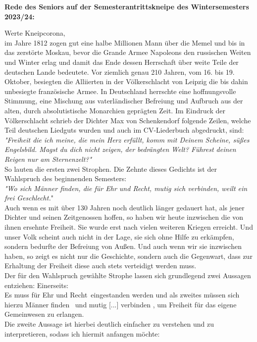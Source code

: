 \begin{multicols}{2}
\textbf{Rede des Seniors auf der Semesterantrittskneipe des Wintersemesters 2023/24:}

Werte Kneipcorona,
\\
im Jahre 1812 zogen gut eine halbe Millionen Mann über die Memel und bis in das zerstörte Moskau, bevor die Grande Armee Napoleons den russischen Weiten und Winter erlag und damit das Ende dessen Herrschaft über weite Teile der deutschen Lande bedeutete.
Vor ziemlich genau 210 Jahren, vom 16. bis 19. Oktober, besiegten die Alliierten in der Völkerschlacht von Leipzig die bis dahin unbesiegte französische Armee.
In Deutschland herrschte eine hoffnungsvolle Stimmung, eine Mischung aus vaterländischer Befreiung und Aufbruch aus der alten, durch absolutistische Monarchien geprägten Zeit.
Im Eindruck der Völkerschlacht schrieb der Dichter Max von Schenkendorf folgende Zeilen, welche Teil deutschen Liedguts wurden und auch im CV-Liederbuch abgedruckt, sind:
\\
\textit{"Freiheit die ich meine, die mein Herz erfüllt,
komm mit Deinem Scheine, süßes Engelsbild.
Magst du dich nicht zeigen, der bedrängten Welt?
Führest deinen Reigen nur am Sternenzelt?"}
\\
So lauten die ersten zwei Strophen. Die Zehnte dieses Gedichts ist der Wahlspruch des beginnenden Semesters:
\\
\textit{"Wo sich Männer finden, die für Ehr und Recht,
mutig sich verbinden, weilt ein frei Geschlecht.}"
\\
Auch wenn es mit über 130 Jahren noch deutlich länger gedauert hat, als jener Dichter und seinen Zeitgenossen hoffen, so haben wir heute inzwischen die von ihnen ersehnte Freiheit.
Sie wurde erst nach vielen weiteren Kriegen erreicht. Und unser Volk scheint auch nicht in der Lage, sie sich ohne Hilfe zu erkämpfen, sondern bedurfte der Befreiung von Außen.
Und auch wenn wir sie inzwischen haben, so zeigt es nicht nur die Geschichte, sondern auch die Gegenwart, dass zur Erhaltung der Freiheit diese auch stets verteidigt werden muss.
\\
Der für den Wahlspruch gewählte Strophe lassen sich grundlegend zwei Aussagen entziehen:
Einerseits:
\\ Es muss für \glqq Ehr und Recht\grqq ~eingestanden werden
und als zweites müssen sich hierzu \glqq Männer finden \grqq ~und \glqq mutig [...] verbinden \grqq ,
um Freiheit für das eigene Gemeinwesen zu erlangen.
\\
Die zweite Aussage ist hierbei deutlich einfacher zu verstehen und zu interpretieren, sodass ich hiermit anfangen möchte:

\end{multicols}
